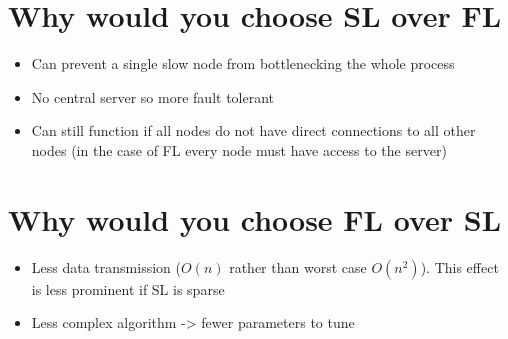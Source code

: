 \section{Why would you choose SL over FL}
\begin{itemize}
	\item Can prevent a single slow node from bottlenecking the whole process
	\item No central server so more fault tolerant
	\item Can still function if all nodes do not have direct connections to all other nodes (in the case of FL every node must have access to the server)
\end{itemize}
\section{Why would you choose FL over SL}
\begin{itemize}
	\item Less data transmission ($O(n)$ rather than worst case $O(n^2)$). This effect is less prominent if SL is sparse
	\item Less complex algorithm -> fewer parameters to tune
\end{itemize}